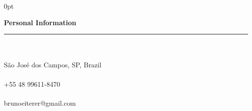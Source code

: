 \documentclass[a4paper]{article}
\begin{document}
\begin{adjustwidth}{\parindent}{0pt}
\begin{minipage}[t]{0.65\textwidth}
\end{minipage} \hspace{0.03\textwidth}
\begin{minipage}[t]{0.25\textwidth}
  \raggedright
  \Large{\textbf{Personal Information}} \normalsize \\ \rule{\textwidth}{0.5pt} \\ \hspace{0pt} \\
   \small{São José dos Campos, SP, Brazil} \\ \hspace{0pt} \\
   \small{+55 48 99611-8470} \\ \hspace{0pt} \\
  \small{brunoeiterer@gmail.com} \\ \hspace{0pt} \\

\end{minipage}
\end{adjustwidth}
\end{document}
